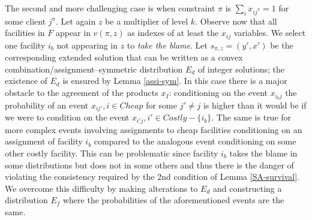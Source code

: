\documentclass[11pt]{article}
\begin{document}
The  second and  more challenging  case  is when  constraint $\pi$  is
$\sum_{i}x_{ij^{\pi}}=1$ for some client $j^{\pi}$. Let again $z$ be a
multiplier of level $k$. Observe now that all facilities in $F$ appear
in $v(\pi,z)$ as indexes of at least the $x_{ij}$ variables. We select
one facility $i_b$ not appearing  in $z$ to \emph{take the blame}. Let
$s_{\pi ,z}=(y',x')$  be the corresponding extended  solution that can
be written as  a convex combination/assignment--symmetric distribution
$E_d$  of integer solutions; the  existence of  $E_d$ is  ensured by
Lemma \ref{assi-sym}.  In this case there  is a major  obstacle to the
agreement  of   the  products  $x_{I}$:  conditioning   on  the  event
$x_{i_bj}$ the  probability of an event $x_{ij'},i\in  Cheap$ for some
$j'\neq j$ is higher  than it would be if we were  to condition on the
event  $x_{i'j},i'\in  Costly-\{i_b\}$.  The  same is  true  for  more
complex events involving  assignments to cheap facilities conditioning
on an  assignment of  facility $i_b$ compared  to the  analogous event
conditioning on  some other costly  facility. This can  be problematic
since facility  $i_b$ takes the  blame in some distributions  but does
not  in some  others and  thus there  is the  danger of  violating the
consistency    required    by    the    2nd   condition    of    Lemma
\ref{SA-survival}. We  overcome this difficulty  by making alterations
to $E_d$ and constructing a distribution $E_f$ where the probabilities
of the aforementioned events are the same.
\end{document}
